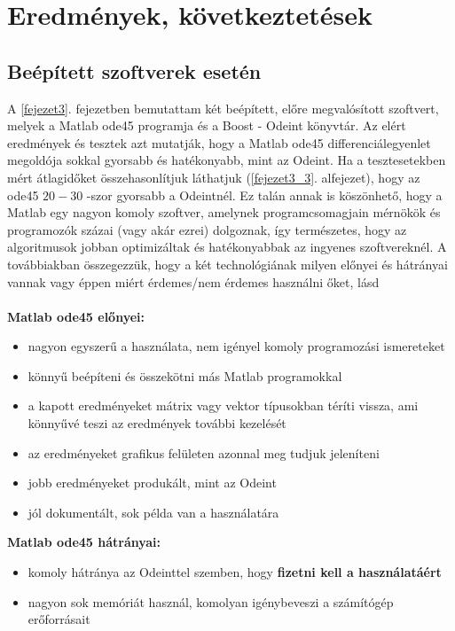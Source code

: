 \chapter{Eredmények, következtetések}

\section {Beépített szoftverek esetén}

A \ref{fejezet3}. fejezetben bemutattam két beépített, előre megvalósított szoftvert, melyek a Matlab ode45 programja és a Boost - Odeint könyvtár. Az elért eredmények és tesztek azt mutatják, hogy a Matlab ode45 differenciálegyenlet megoldója sokkal gyorsabb és hatékonyabb, mint az Odeint. Ha a tesztesetekben mért átlagidőket összehasonlítjuk láthatjuk (\ref{fejezet3_3}. alfejezet), hogy az ode45 $ 20-30 $ -szor gyorsabb a Odeintnél. Ez talán annak is köszönhető, hogy a Matlab egy nagyon komoly szoftver, amelynek programcsomagjain mérnökök és programozók százai  (vagy akár ezrei) dolgoznak, így természetes, hogy az algoritmusok jobban optimizáltak és hatékonyabbak az ingyenes szoftvereknél. A továbbiakban összegezzük, hogy a két technológiának milyen előnyei és hátrányai vannak vagy éppen miért érdemes/nem érdemes használni őket, l\'asd \cite{Lovasz}
\\ \\
\textbf{Matlab ode45 előnyei:}
\begin{itemize}
	\item nagyon egyszerű a használata, nem igényel komoly programozási ismereteket
	\item könnyű beépíteni és összekötni más Matlab programokkal
	\item a kapott eredményeket mátrix vagy vektor típusokban téríti vissza, ami könnyűvé teszi az eredmények további kezelését
	\item az eredményeket grafikus felületen azonnal meg tudjuk jeleníteni
	\item jobb eredményeket produkált, mint az Odeint
	\item jól dokumentált, sok példa van a használatára
\end{itemize}
\pagebreak
\textbf{Matlab ode45 hátrányai:}
\begin{itemize}
	\item komoly hátránya az Odeinttel szemben, hogy \textbf{fizetni kell a használatáért}
	\item nagyon sok memóriát használ, komolyan igénybeveszi a számítógép erőforrásait
\end{itemize}
